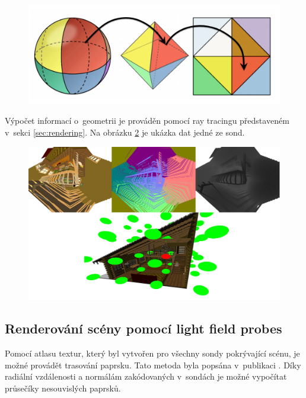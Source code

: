 \begin{figure}[H]
	\centering
	\includegraphics[scale=2]{images/octahedral_wrap.png}
	\captionsetup{justification=centering}
	\label{fig:octahedral_wrap}
\end{figure}

Výpočet informací o~geometrii je prováděn pomocí ray tracingu představeném v~sekci \ref{sec:rendering}. Na obrázku \ref{fig:probe_in_scene} je ukázka dat jedné ze sond.


\begin{figure}[H]
	\centering
	\includegraphics[scale=1]{images/probe_with_scene.png}
	\captionsetup{justification=centering}
	\label{fig:probe_in_scene}
\end{figure}

\subsection{Renderování scény pomocí light field probes}\label{sec:render_lfp}
Pomocí atlasu textur, který byl vytvořen pro všechny sondy pokrývající scénu, je možné provádět trasování paprsku. Tato metoda byla popsána v~publikaci \cite{light_field_probes}. Díky radiální vzdálenosti a normálám zakódovaných v~sondách je možné vypočítat průsečíky nesouvislých paprsků.

